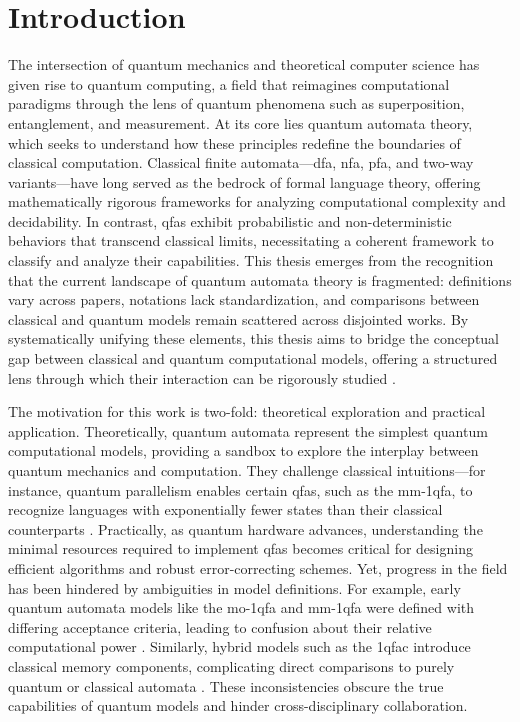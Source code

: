\chapter{Introduction}  
\label{chap:introduction}

The intersection of quantum mechanics and theoretical computer science has given rise to quantum computing, a field that reimagines computational paradigms through the lens of quantum phenomena such as superposition, entanglement, and measurement. At its core lies quantum automata theory, which seeks to understand how these principles redefine the boundaries of classical computation. Classical finite automata—\gls{dfa}, \gls{nfa}, \gls{pfa}, and two-way variants—have long served as the bedrock of formal language theory, offering mathematically rigorous frameworks for analyzing computational complexity and decidability. In contrast, \glspl{qfa} exhibit probabilistic and non-deterministic behaviors that transcend classical limits, necessitating a coherent framework to classify and analyze their capabilities. This thesis emerges from the recognition that the current landscape of quantum automata theory is fragmented: definitions vary across papers, notations lack standardization, and comparisons between classical and quantum models remain scattered across disjointed works. By systematically unifying these elements, this thesis aims to bridge the conceptual gap between classical and quantum computational models, offering a structured lens through which their interaction can be rigorously studied \cite{ambainis2009superiority}.  

The motivation for this work is two-fold: theoretical exploration and practical application. Theoretically, quantum automata represent the simplest quantum computational models, providing a sandbox to explore the interplay between quantum mechanics and computation. They challenge classical intuitions—for instance, quantum parallelism enables certain \glspl{qfa}, such as the \gls{mm-1qfa}, to recognize languages with exponentially fewer states than their classical counterparts \cite{moore2000quantum}. Practically, as quantum hardware advances, understanding the minimal resources required to implement \glspl{qfa} becomes critical for designing efficient algorithms and robust error-correcting schemes. Yet, progress in the field has been hindered by ambiguities in model definitions. For example, early quantum automata models like the \gls{mo-1qfa} and \gls{mm-1qfa} were defined with differing acceptance criteria, leading to confusion about their relative computational power \cite{kondacs1997power}. Similarly, hybrid models such as the \gls{1qfac} introduce classical memory components, complicating direct comparisons to purely quantum or classical automata \cite{zheng2012one}. These inconsistencies obscure the true capabilities of quantum models and hinder cross-disciplinary collaboration.

